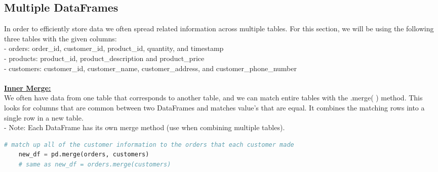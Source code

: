 \documentclass[11pt, a4paper]{article}
\begin{document}
\begin{spacing}{1.1}
	\subsection{Multiple DataFrames}
	In order to efficiently store data we often spread related information across multiple tables. For this section, we will be using the following three tables with the given columns: \vspace*{.5mm} \\
	- orders: order\_id, customer\_id, product\_id, quantity, and timestamp \vspace*{.5mm} \\
	- products: product\_id, product\_description and product\_price\vspace*{.5mm} \\
	- customers: customer\_id, customer\_name, customer\_address, and customer\_phone\_number \\~\\
	\underline{\textbf{Inner Merge:}} \\
	We often have data from one table that corresponds to another table, and we can match entire tables with the .merge( ) method. This looks for columns that are common between two DataFrames and matches value's that are equal. It combines the matching rows into a single row in a new table. \\
	\hspace*{3mm} - Note: Each DataFrame has its own merge method (use when combining multiple tables).
	\begin{lstlisting}[language=Python]
	# match up all of the customer information to the orders that each customer made
	new_df = pd.merge(orders, customers) 
	# same as new_df = orders.merge(customers)
	

\end{lstlisting}
\end{spacing}
\end{document}

